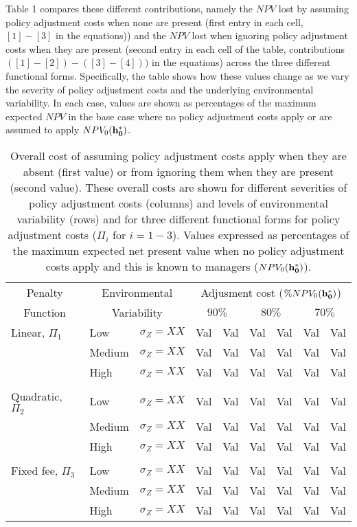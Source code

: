 \documentclass[12pt]{article}
\begin{document}
Table 1 compares these different contributions, namely the $NPV$ lost by assuming policy adjustment costs when none are present (first entry in each cell, $[1]-[3]$ in the equations)) and the $NPV$ lost when ignoring policy adjustment costs when they are present (second entry in each cell of the table, contributions $([1]-[2])-([3]-[4]))$ in the equations) across the three different functional forms. Specifically, the table shows how these values change as we vary the severity of policy adjustment costs and the underlying environmental variability. In each case, values are shown as percentages of the maximum expected $NPV$ in the base case where no policy adjustment costs apply or are assumed to apply $NPV_0({\bf h_0^*})$.

\begin{table}
\begin{tabular}{l|l l|rr|rr|rr}
 \multicolumn{1}{c|}{Penalty}& \multicolumn{2}{c|}{Environmental}&\multicolumn{6}{c}{Adjusment cost ($\% NPV_0 ({\bf h_0^*})$)}  \\ 
\multicolumn{1}{c|}{Function}& \multicolumn{2}{c|}{Variability}& \multicolumn{2}{c}{$90\%$} &\multicolumn{2}{c}{$80\%$} & \multicolumn{2}{c}{$70\%$} \\ \hline 
Linear, $\Pi_1$ & Low & $\sigma_Z=XX$ & Val & Val & Val & Val & Val & Val \\ 
 &  Medium & $\sigma_Z=XX$ & Val & Val & Val & Val & Val & Val \\  
&  High & $\sigma_Z=XX$ & Val & Val & Val & Val & Val & Val \\ 
&  &  &  &  &  &  &  &  \\ 
Quadratic, $\Pi_2$  & Low & $\sigma_Z=XX$ & Val & Val & Val & Val & Val & Val \\ 
 &  Medium & $\sigma_Z=XX$ & Val & Val & Val & Val & Val & Val \\  
&  High & $\sigma_Z=XX$ & Val & Val & Val & Val & Val & Val \\ 
&  &  &  &  &  &  &  &  \\ 
Fixed fee, $\Pi_3$  & Low & $\sigma_Z=XX$ & Val & Val & Val & Val & Val & Val \\ 
 &  Medium & $\sigma_Z=XX$ & Val & Val & Val & Val & Val & Val \\  
&  High & $\sigma_Z=XX$ & Val & Val & Val & Val & Val & Val 
\end{tabular}
\caption{Overall cost of assuming policy adjustment costs apply when they are absent (first value) or from ignoring them when they are present (second value). These overall costs are shown for different severities of policy adjustment costs (columns) and levels of environmental variability (rows) and for three different functional forms for policy adjustment costs ($\Pi_i$ for $ i=1-3$). Values expressed as percentages of the maximum expected net present value when no policy adjustment costs apply and this is known to managers ($ NPV_0 ({\bf h_0^*}) $). }
\end{table}
\end{document}
